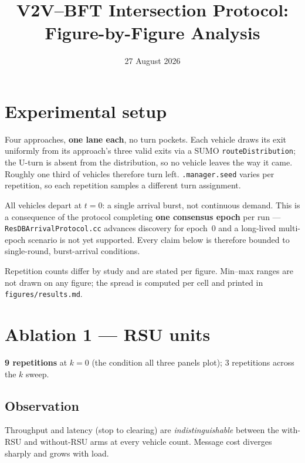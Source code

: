 \documentclass[11pt,a4paper]{article}
\title{V2V--BFT Intersection Protocol:\\Figure-by-Figure Analysis}
\author{}
\date{27 August 2026}
\newcommand{\code}[1]{\texttt{\small #1}}
\begin{document}
\maketitle

\section{Experimental setup}

Four approaches, \textbf{one lane each}, no turn pockets. Each vehicle draws its
exit uniformly from its approach's three valid exits via a SUMO
\code{routeDistribution}; the U-turn is absent from the distribution, so no
vehicle leaves the way it came. Roughly one third of vehicles therefore turn
left. \code{*.manager.seed} varies per repetition, so each repetition samples a
different turn assignment.

All vehicles depart at $t=0$: a single arrival burst, not continuous demand.
This is a consequence of the protocol completing \textbf{one consensus epoch}
per run --- \code{ResDBArrivalProtocol.cc} advances discovery for epoch~0 and a
long-lived multi-epoch scenario is not yet supported. Every claim below is
therefore bounded to single-round, burst-arrival conditions.

Repetition counts differ by study and are stated per figure. Min--max ranges are
not drawn on any figure; the spread is computed per cell and printed in
\code{figures/results.md}.

\section{Ablation 1 --- RSU units}

\textbf{9 repetitions} at $k{=}0$ (the condition all three panels plot);
3 repetitions across the $k$ sweep.

\subsection*{Observation}

Throughput and latency (stop to clearing) are \emph{indistinguishable} between the
with-RSU and without-RSU arms at every vehicle count. Message cost diverges
sharply and grows with load.
\end{document}

